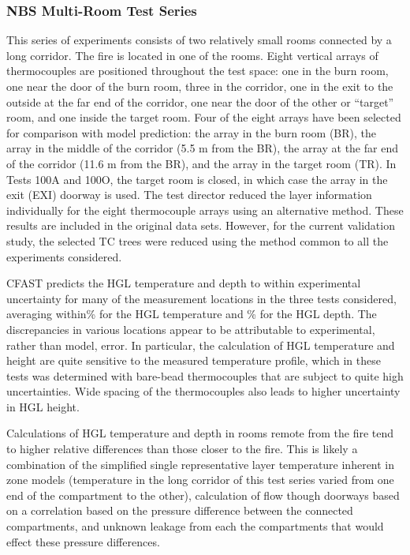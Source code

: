 \subsubsection{NBS Multi-Room Test Series}

This series of experiments consists of two relatively small rooms connected by a long corridor. The fire is located in one of the rooms.  Eight vertical arrays of thermocouples are positioned throughout the test space: one in the burn room, one near the door of the burn room, three in the corridor, one in the exit to the outside at the far end of the corridor, one near the door of the other or ``target'' room, and one inside the target room.  Four of the eight arrays have been selected for comparison with model prediction: the array in the burn room (BR), the array in the middle of the corridor (5.5 m from the BR), the array at the far end of the corridor (11.6 m from the BR), and the array in the target room (TR).  In Tests 100A and 100O, the target room is closed, in which case the array in the exit (EXI) doorway is used. The test director reduced the layer information individually for the eight thermocouple arrays using an alternative method. These results are included in the original data sets. However, for the current validation study, the selected TC trees were reduced using the method common to all the experiments considered.  

CFAST predicts the HGL temperature and depth to within experimental uncertainty for many of the measurement locations in the three tests considered, averaging within\nbscorrtempavg	\% for the HGL temperature and \nbscorrhgtavg	 \% for the HGL depth.  The discrepancies in various locations appear to be attributable to experimental, rather than model, error.  In particular, the calculation of HGL temperature and height are quite sensitive to the measured temperature profile, which in these tests was determined with bare-bead thermocouples that are subject to quite high uncertainties.  Wide spacing of the thermocouples also leads to higher uncertainty in HGL height.

Calculations of HGL temperature and depth in rooms remote from the fire tend to higher
relative differences than those closer to the fire. This is likely a combination of the simplified single representative layer temperature inherent in zone models (temperature in the long corridor of this test series varied from one end of the compartment to the other), calculation of flow though doorways based on a correlation based on the pressure difference between the connected compartments, and unknown leakage from each the compartments that would effect these pressure differences.

